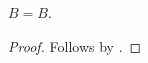 

\begin{proposition}\label{phase7_composition_diamond_right}
    $B=B$.
\end{proposition}
\begin{proof}
    Follows by \auto.
\end{proof}
